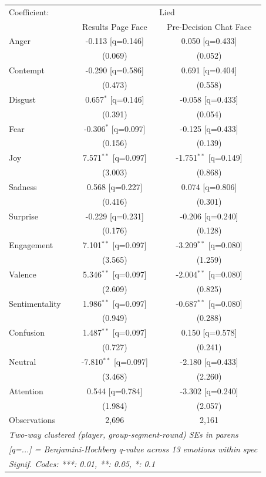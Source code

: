 \begingroup
\centering
\begin{tabular}{lcc}
   \tabularnewline \midrule \midrule
   Coefficient: & \multicolumn{2}{c}{Lied}\\
    & Results Page Face & Pre-Decision Chat Face \\
   \midrule
   Anger & -0.113 [q=0.146] & 0.050 [q=0.433]\\
    & (0.069) & (0.052)\\
   Contempt & -0.290 [q=0.586] & 0.691 [q=0.404]\\
    & (0.473) & (0.558)\\
   Disgust & 0.657$^{*}$ [q=0.146] & -0.058 [q=0.433]\\
    & (0.391) & (0.054)\\
   Fear & -0.306$^{*}$ [q=0.097] & -0.125 [q=0.433]\\
    & (0.156) & (0.139)\\
   Joy & 7.571$^{**}$ [q=0.097] & -1.751$^{**}$ [q=0.149]\\
    & (3.003) & (0.868)\\
   Sadness & 0.568 [q=0.227] & 0.074 [q=0.806]\\
    & (0.416) & (0.301)\\
   Surprise & -0.229 [q=0.231] & -0.206 [q=0.240]\\
    & (0.176) & (0.128)\\
   Engagement & 7.101$^{**}$ [q=0.097] & -3.209$^{**}$ [q=0.080]\\
    & (3.565) & (1.259)\\
   Valence & 5.346$^{**}$ [q=0.097] & -2.004$^{**}$ [q=0.080]\\
    & (2.609) & (0.825)\\
   Sentimentality & 1.986$^{**}$ [q=0.097] & -0.687$^{**}$ [q=0.080]\\
    & (0.949) & (0.288)\\
   Confusion & 1.487$^{**}$ [q=0.097] & 0.150 [q=0.578]\\
    & (0.727) & (0.241)\\
   Neutral & -7.810$^{**}$ [q=0.097] & -2.180 [q=0.433]\\
    & (3.468) & (2.260)\\
   Attention & 0.544 [q=0.784] & -3.302 [q=0.240]\\
    & (1.984) & (2.057)\\
   \midrule
   Observations & 2,696 & 2,161\\
   \midrule \midrule
   \multicolumn{3}{l}{\emph{Two-way clustered (player, group-segment-round) SEs in parens}}\\
   \multicolumn{3}{l}{\emph{[q=...] = Benjamini-Hochberg q-value across 13 emotions within spec}}\\
   \multicolumn{3}{l}{\emph{Signif. Codes: ***: 0.01, **: 0.05, *: 0.1}}\\
\end{tabular}
\par\endgroup
